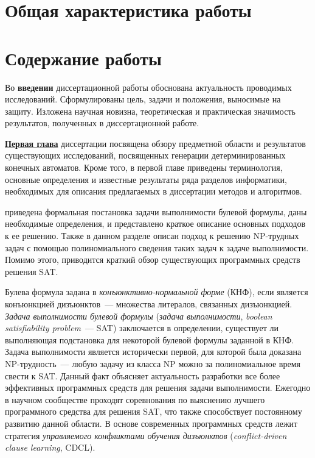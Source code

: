 
\section*{Общая характеристика работы} %



\newpage

\section*{Содержание работы}

Во \textbf{введении} диссертационной работы обоснована актуальность проводимых исследований. Сформулированы цель, задачи и положения, выносимые на защиту. Изложена научная новизна, теоретическая и практическая значимость результатов, полученных в диссертационной работе.

\textbf{\underline{Первая глава}} диссертации посвящена обзору предметной области и результатов существующих исследований, посвященных генерации детерминированных конечных автоматов.
Кроме того, в первой главе приведены терминология, основные определения и известные результаты ряда разделов информатики, необходимых для описания предлагаемых в диссертации методов и алгоритмов.

\insection{\ref{sec:review:sat}} приведена формальная постановка задачи выполнимости булевой формулы, даны необходимые определения, и представлено краткое описание основных подходов к ее решению.
Также в данном разделе описан подход к решению NP-трудных задач с помощью полиномиального сведения таких задач к задаче выполнимости.
Помимо этого, приводится краткий обзор существующих программных средств решения SAT.

Булева формула задана в \emph{конъюнктивно-нормальной форме} (КНФ), если является конъюнкцией дизъюнктов~--- множества литералов, связанных дизъюнкцией.
\emph{Задача выполнимости булевой формулы} (\emph{задача выполнимости}, \emph{boolean satisfiability problem}~{---} SAT) заключается в определении, существует ли выполняющая подстановка для некоторой булевой формулы заданной в КНФ.
Задача выполнимости является исторически первой, для которой была доказана NP-трудность~--- любую задачу из класса NP можно за полиномиальное время свести к SAT.
Данный факт объясняет актуальность разработки все более эффективных программных средств для решения задачи выполнимости.
Ежегодно в научном сообществе проходят соревнования по выяснению лучшего программного средства для решения SAT, что также способствует постоянному развитию данной области.
В основе современных программных средств лежит стратегия \emph{управляемого конфликтами обучения дизъюнктов} (\emph{conflict-driven clause learning}, CDCL).

